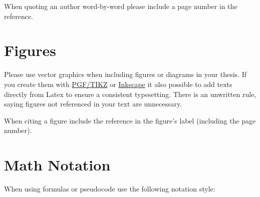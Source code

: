 When quoting an author word-by-word please include a page number in the reference.

\section{Figures}

Please use vector graphics when including figures or diagrams in your thesis.
If you create them with \href{https://en.wikipedia.org/wiki/PGF/TikZ}{PGF/TIKZ} or \href{https://inkscape.org/}{Inkscape} it also possible to add texts directly from Latex to ensure a consistent typesetting.
There is an unwritten rule, saying figures not referenced in your text are unnecessary.

When citing a figure include the reference in the figure's label (including the page number).

\section{Math Notation}

When using formulas or pseudocode use the following notation style:

